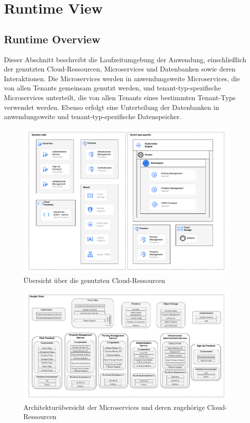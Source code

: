 \section{Runtime View}
\subsection{Runtime Overview}
Dieser Abschnitt beschreibt die Laufzeitumgebung der Anwendung, einschließlich der genutzten Cloud-Ressourcen, Microservices und Datenbanken sowie deren Interaktionen.
Die Microservices werden in anwendungsweite Microservices, die von allen Tenants gemeinsam genutzt werden, und tenant-typ-spezifische Microservices unterteilt, die von allen Tenants eines bestimmten Tenant-Typs verwendet werden.
Ebenso erfolgt eine Unterteilung der Datenbanken in anwendungsweite und tenant-typ-spezifische Datenspeicher.

\begin{figure}[H]
	\centering
	\includegraphics[width=\textwidth]{resources/03-runtime-view/pdf/cloud-ressources.pdf}
	\caption{Übersicht über die genutzten Cloud-Ressourcen}
	\label{fig:cloud-ressources}
\end{figure}

\begin{figure}[H]
	\centering
	\includegraphics[width=\textwidth]{resources/03-runtime-view/pdf/architecture.pdf}
	\caption{Architekturübersicht der Microservices und deren zugehörige Cloud-Ressourcen}
	\label{fig:system-architecture}
\end{figure}

